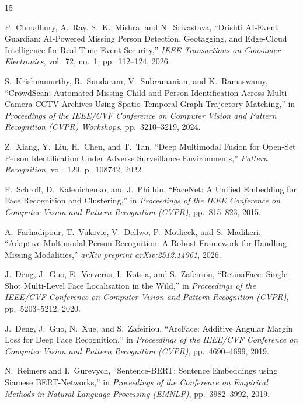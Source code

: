 \documentclass[conference]{IEEEtran}
\begin{document}
\begin{thebibliography}{15}

P.~Choudhury, A.~Ray, S.~K.~Mishra, and N.~Srivastava,
``Drishti AI-Event Guardian: AI-Powered Missing Person Detection, Geotagging, and Edge-Cloud Intelligence for Real-Time Event Security,''
\emph{IEEE Transactions on Consumer Electronics}, vol.~72, no.~1, pp.~112--124, 2026.

S.~Krishnamurthy, R.~Sundaram, V.~Subramanian, and K.~Ramaswamy,
``CrowdScan: Automated Missing-Child and Person Identification Across Multi-Camera CCTV Archives Using Spatio-Temporal Graph Trajectory Matching,''
in \emph{Proceedings of the IEEE/CVF Conference on Computer Vision and Pattern Recognition (CVPR) Workshops}, pp.~3210--3219, 2024.

Z.~Xiang, Y.~Liu, H.~Chen, and T.~Tan,
``Deep Multimodal Fusion for Open-Set Person Identification Under Adverse Surveillance Environments,''
\emph{Pattern Recognition}, vol.~129, p.~108742, 2022.

F.~Schroff, D.~Kalenichenko, and J.~Philbin,
``FaceNet: A Unified Embedding for Face Recognition and Clustering,''
in \emph{Proceedings of the IEEE Conference on Computer Vision and Pattern Recognition (CVPR)}, pp.~815--823, 2015.

A.~Farhadipour, T.~Vukovic, V.~Dellwo, P.~Motlicek, and S.~Madikeri,
``Adaptive Multimodal Person Recognition: A Robust Framework for Handling Missing Modalities,''
\emph{arXiv preprint arXiv:2512.14961}, 2026.

J.~Deng, J.~Guo, E.~Ververas, I.~Kotsia, and S.~Zafeiriou,
``RetinaFace: Single-Shot Multi-Level Face Localisation in the Wild,''
in \emph{Proceedings of the IEEE/CVF Conference on Computer Vision and Pattern Recognition (CVPR)}, pp.~5203--5212, 2020.

J.~Deng, J.~Guo, N.~Xue, and S.~Zafeiriou,
``ArcFace: Additive Angular Margin Loss for Deep Face Recognition,''
in \emph{Proceedings of the IEEE/CVF Conference on Computer Vision and Pattern Recognition (CVPR)}, pp.~4690--4699, 2019.

N.~Reimers and I.~Gurevych,
``Sentence-BERT: Sentence Embeddings using Siamese BERT-Networks,''
in \emph{Proceedings of the Conference on Empirical Methods in Natural Language Processing (EMNLP)}, pp.~3982--3992, 2019.


\end{thebibliography}
\end{document}
